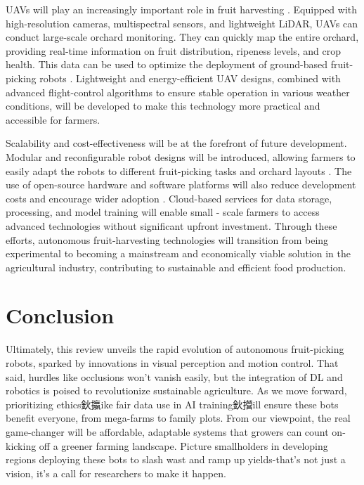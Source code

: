 \documentclass[a4paper,fleqn]{cas-dc}
\begin{document}
UAVs will play an increasingly important role in fruit harvesting \cite{mohamed2021smart, martos2021ensuring}. Equipped with high-resolution cameras, multispectral sensors, and lightweight LiDAR, UAVs can conduct large-scale orchard monitoring. They can quickly map the entire orchard, providing real-time information on fruit distribution, ripeness levels, and crop health. This data can be used to optimize the deployment of ground-based fruit-picking robots \cite{martos2021ensuring}. Lightweight and energy-efficient UAV designs, combined with advanced flight-control algorithms to ensure stable operation in various weather conditions, will be developed to make this technology more practical and accessible for farmers.

Scalability and cost-effectiveness will be at the forefront of future development. Modular and reconfigurable robot designs will be introduced, allowing farmers to easily adapt the robots to different fruit-picking tasks and orchard layouts \cite{lytridis2021overview, li2023multi}. The use of open-source hardware and software platforms will also reduce development costs and encourage wider adoption \cite{zhang2024automatic}. Cloud-based services for data storage, processing, and model training will enable small - scale farmers to access advanced technologies without significant upfront investment. Through these efforts, autonomous fruit-harvesting technologies will transition from being experimental to becoming a mainstream and economically viable solution in the agricultural industry, contributing to sustainable and efficient food production.



\section{Conclusion}
Ultimately, this review unveils the rapid evolution of autonomous fruit-picking robots, sparked by innovations in visual perception and motion control. That said, hurdles like occlusions won't vanish easily, but the integration of DL and robotics is poised to revolutionize sustainable agriculture.  As we move forward, prioritizing ethics鈥攍ike fair data use in AI training鈥攚ill ensure these bots benefit everyone, from mega-farms to family plots. From our viewpoint, the real game-changer will be affordable, adaptable systems that growers can count on-kicking off a greener farming landscape. Picture smallholders in developing regions deploying these bots to slash wast and ramp up yields-that's not just a vision, it's a call for researchers to make it happen. 
\end{document}
